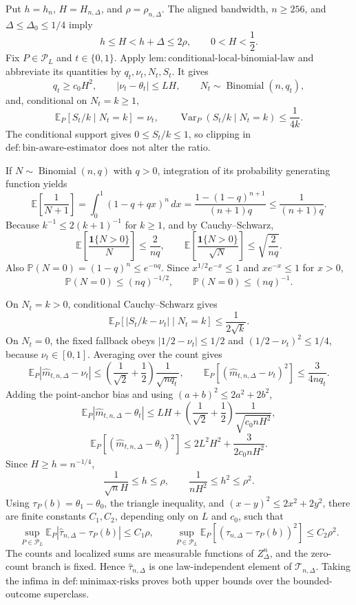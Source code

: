 Put \(h=h_n\), \(H=H_{n,\Delta}\), and \(\rho=\rho_{n,\Delta}\).  The aligned bandwidth, \(n\geq256\), and \(\Delta\leq\Delta_0\leq1/4\) imply
\[
 h\leq H<h+\Delta\leq2\rho,
 \qquad 0<H<\frac12.
\]
Fix \(P\in\mathcal P_L\) and \(t\in\{0,1\}\).  Apply \(\mathrm{lem:conditional\text{-}local\text{-}binomial\text{-}law}\) and abbreviate its quantities by \(q_t,\nu_t,N_t,S_t\).  It gives
\[
 q_t\geq c_0H^2,
 \qquad |\nu_t-\theta_t|\leq LH,
 \qquad N_t\sim\operatorname{Binomial}(n,q_t),
\]
and, conditional on \(N_t=k\geq1\),
\[
 \mathbb E_P[S_t/k\mid N_t=k]=\nu_t,
 \qquad
 \operatorname{Var}_P(S_t/k\mid N_t=k)\leq\frac1{4k}.
\]
The conditional support gives \(0\leq S_t/k\leq1\), so clipping in \(\mathrm{def:bin\text{-}aware\text{-}estimator}\) does not alter the ratio.

If \(N\sim\operatorname{Binomial}(n,q)\) with \(q>0\), integration of its probability generating function yields
\[
 \mathbb E\!\left[\frac1{N+1}\right]
 =\int_0^1(1-q+qx)^n\,dx
 =\frac{1-(1-q)^{n+1}}{(n+1)q}
 \leq\frac1{(n+1)q}.
\]
Because \(k^{-1}\leq2(k+1)^{-1}\) for \(k\geq1\), and by Cauchy--Schwarz,
\[
 \mathbb E\!\left[\frac{\mathbf1\{N>0\}}N\right]\leq\frac2{nq},
 \qquad
 \mathbb E\!\left[\frac{\mathbf1\{N>0\}}{\sqrt N}\right]
 \leq\sqrt{\frac2{nq}}.
\]
Also \(\mathbb P(N=0)=(1-q)^n\leq e^{-nq}\).  Since \(x^{1/2}e^{-x}\leq1\) and \(xe^{-x}\leq1\) for \(x>0\),
\[
 \mathbb P(N=0)\leq(nq)^{-1/2},
 \qquad
 \mathbb P(N=0)\leq(nq)^{-1}.
\]

On \(N_t=k>0\), conditional Cauchy--Schwarz gives
\[
 \mathbb E_P[|S_t/k-\nu_t|\mid N_t=k]\leq\frac1{2\sqrt k}.
\]
On \(N_t=0\), the fixed fallback obeys \(|1/2-\nu_t|\leq1/2\) and \((1/2-\nu_t)^2\leq1/4\), because \(\nu_t\in[0,1]\).  Averaging over the count gives
\[
 \mathbb E_P|\widehat m_{t,n,\Delta}-\nu_t|
 \leq\left(\frac1{\sqrt2}+\frac12\right)\frac1{\sqrt{nq_t}},
 \qquad
 \mathbb E_P[(\widehat m_{t,n,\Delta}-\nu_t)^2]
 \leq\frac3{4nq_t}.
\]
Adding the point-anchor bias and using \((a+b)^2\leq2a^2+2b^2\),
\[
 \mathbb E_P|\widehat m_{t,n,\Delta}-\theta_t|
 \leq LH+\left(\frac1{\sqrt2}+\frac12\right)\frac1{\sqrt{c_0nH^2}},
\]
\[
 \mathbb E_P[(\widehat m_{t,n,\Delta}-\theta_t)^2]
 \leq2L^2H^2+\frac3{2c_0nH^2}.
\]
Since \(H\geq h=n^{-1/4}\),
\[
 \frac1{\sqrt nH}\leq h\leq\rho,
 \qquad
 \frac1{nH^2}\leq h^2\leq\rho^2.
\]
Using \(\tau_P(b)=\theta_1-\theta_0\), the triangle inequality, and \((x-y)^2\leq2x^2+2y^2\), there are finite constants \(C_1,C_2\), depending only on \(L\) and \(c_0\), such that
\[
 \sup_{P\in\mathcal P_L}\mathbb E_P|\widehat\tau_{n,\Delta}-\tau_P(b)|\leq C_1\rho,
 \qquad
 \sup_{P\in\mathcal P_L}\mathbb E_P[(\widehat\tau_{n,\Delta}-\tau_P(b))^2]\leq C_2\rho^2.
\]
The counts and localized sums are measurable functions of \(Z_\Delta^n\), and the zero-count branch is fixed.  Hence \(\widehat\tau_{n,\Delta}\) is one law-independent element of \(\mathcal T_{n,\Delta}\).  Taking the infima in \(\mathrm{def:minimax\text{-}risks}\) proves both upper bounds over the bounded-outcome superclass.

